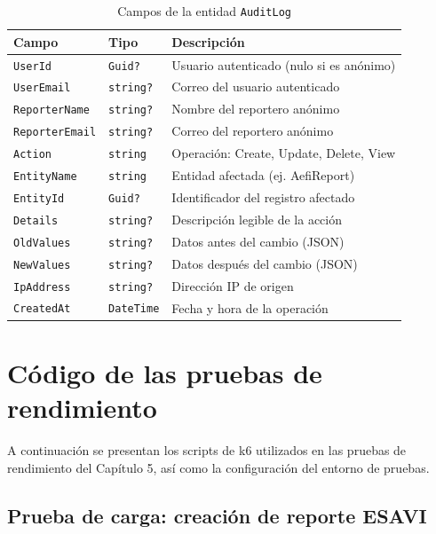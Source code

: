 \begin{table}[H]
\centering
\caption{Campos de la entidad \texttt{AuditLog}}
\label{tab:auditlog}
\begin{tabular}{|l|l|p{6cm}|}
\hline
\textbf{Campo} & \textbf{Tipo} & \textbf{Descripción} \\
\hline
\texttt{UserId} & \texttt{Guid?} & Usuario autenticado (nulo si es anónimo) \\
\texttt{UserEmail} & \texttt{string?} & Correo del usuario autenticado \\
\texttt{ReporterName} & \texttt{string?} & Nombre del reportero anónimo \\
\texttt{ReporterEmail} & \texttt{string?} & Correo del reportero anónimo \\
\texttt{Action} & \texttt{string} & Operación: Create, Update, Delete, View \\
\texttt{EntityName} & \texttt{string} & Entidad afectada (ej. AefiReport) \\
\texttt{EntityId} & \texttt{Guid?} & Identificador del registro afectado \\
\texttt{Details} & \texttt{string?} & Descripción legible de la acción \\
\texttt{OldValues} & \texttt{string?} & Datos antes del cambio (JSON) \\
\texttt{NewValues} & \texttt{string?} & Datos después del cambio (JSON) \\
\texttt{IpAddress} & \texttt{string?} & Dirección IP de origen \\
\texttt{CreatedAt} & \texttt{DateTime} & Fecha y hora de la operación \\
\hline
\end{tabular}
\end{table}




\chapter{Código de las pruebas de rendimiento}
\label{anexo:k6}

A continuación se presentan los scripts de k6 utilizados en las pruebas de rendimiento del Capítulo 5, así como la configuración del entorno de pruebas.

\section{Prueba de carga: creación de reporte ESAVI}
\label{anexo:k6-creacion}

